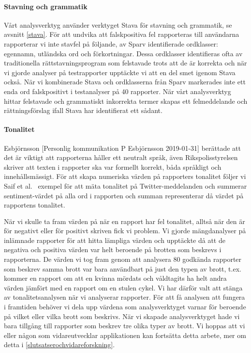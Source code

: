 \documentclass[swedish]{maucsthesis}
\begin{document}
\paragraph*{Stavning och grammatik}

Vårt analysverktyg använder verktyget Stava för stavning och grammatik, se avsnitt \ref{stava}.
För att undvika att falskpositiva fel rapporteras till användarna rapporterar vi inte
stavfel på följande, av Sparv identifierade ordklasser: egennamn, utländska ord och förkortningar.
Dessa ordklasser identifieras ofta av traditionella rättstavningsprogram som felstavade \cite{kann:1997} trots att de är korrekta
och när vi gjorde analyser på testrapporter upptäckte vi att en del smet igenom Stava också.
När vi kombinerade Stava och ordklasserna från Sparv markerades inte ett enda ord falskpositivt i testanalyser på 40 rapporter.
När vårt analysverktyg hittar felstavade och grammatiskt inkorrekta termer skapas ett felmeddelande och rättningsförslag
ifall Stava har identifierat ett sådant.

\paragraph{Tonalitet}

Esbjörnsson [Personlig kommunikation P Esbjörnsson 2019-01-31] berättade att det är viktigt att 
rapporterna håller ett neutralt språk, även Rikspolisstyrelsen~\cite{rfsip} skriver att texten i 
rapporter ska var formellt korrekt, båda språkligt och innehållsmässigt. För att skapa numeriska värden på rapporters tonalitet följer vi Saif et al.~\cite{saif:2016} exempel för att mäta tonalitet på Twitter-meddelanden och summerar sentiment-värdet på alla ord i rapporten och summan representerar då värdet på rapportens tonalitet.

När vi skulle ta fram värden på när en rapport har fel tonalitet, alltså när den är för negativt eller för positivt skriven fick vi problem.
Vi gjorde mängdanalyser på inlämnade rapporter för att hitta lämpliga värden och upptäckte då att de negativa och positiva värden var helt beroende på
brotten som beskrevs i rapporterna. De värden vi tog fram genom att analysera 80 godkända rapporter som beskrev samma brott var bara användbart
på just den typen av brott, t.ex. kommer en rapport om att en kvinna mördats och våldtagits ha helt andra värden jämfört med en rapport om en
stulen cykel. Vi har därför valt att stänga av tonalitetsanalysen när vi analyserar rapporter. För att få analysen att fungera i framtiden
behöver vi dela upp värdena som analysverktyget varnar för beroende på vilket eller vilka brott som beskrivs. När vi skapade analysverktyget
hade vi bara tillgång till rapporter som beskrev tre olika typer av brott. Vi hoppas att vi eller någon som vidareutvecklar applikationen
kan fortsätta detta arbete, mer om detta i \cref{slutsatserochvidareforskning}.
\end{document}
